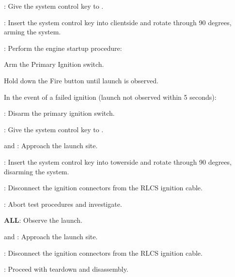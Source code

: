 \begin{checklist}
\begin{checklist}
    \item \control{}
  \end{checklist}
  \item \ops{}: Give the system control key to \control{}.
  \item \control{}: Insert the system control key into clientside and rotate through 90 degrees, arming the system.
  \item \control{}: Perform the engine startup procedure:
  \begin{checklist}
    \item Arm the Primary Ignition switch.
    \item Hold down the Fire button until launch is observed.
    \begin{checklist}[label=$\bullet$]
      \item In the event of a failed ignition (launch not observed within 5 seconds):
      \begin{checklist}
        \item \control{}: Disarm the primary ignition switch.
        \item \control{}: Give the system control key to \primary{}.
        \item \primary{} and \secondary{}: Approach the launch site. 
        \item \primary{}: Insert the system control key into towerside and rotate through 90 degrees, disarming the system.
        \item \primary{}: Disconnect the ignition connectors from the RLCS ignition cable. 
        \item \ops{}: Abort test procedures and investigate.
      \end{checklist}
    \end{checklist}
  \end{checklist}
  \item \textbf{ALL}: Observe the launch. 
  \item \primary{} and \secondary{}: Approach the launch site. 
  \item \primary{}: Disconnect the ignition connectors from the RLCS ignition cable. 
  \item \ops{}: Proceed with teardown and disassembly. 
\end{checklist}
\setcounter{checklistnum}{0}


